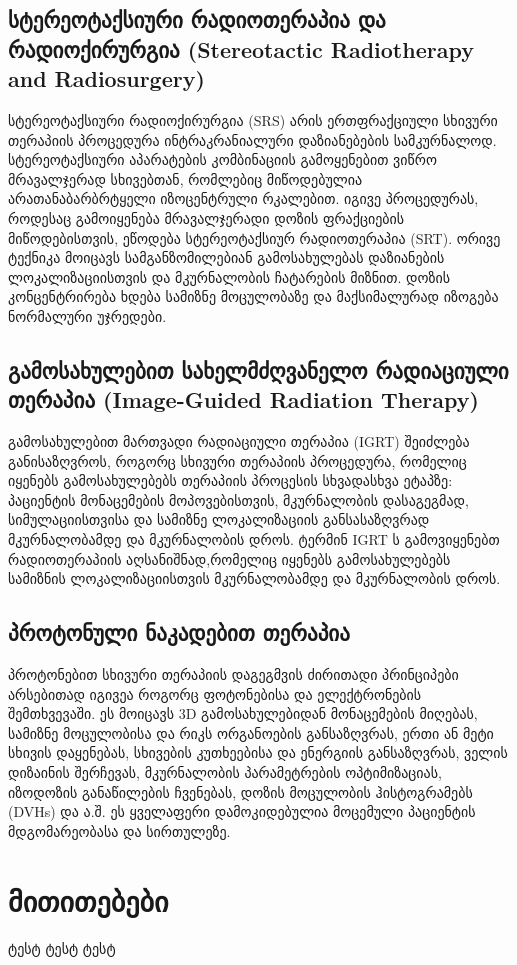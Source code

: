 \documentclass[12pt,a4paper,]{report}
\begin{document}
\section{სტერეოტაქსიური რადიოთერაპია და რადიოქირურგია (Stereotactic Radiotherapy and Radiosurgery)}
სტერეოტაქსიური რადიოქირურგია (SRS) არის ერთფრაქციული სხივური თერაპიის პროცედურა ინტრაკრანიალური დაზიანებების სამკურნალოდ. სტერეოტაქსიური აპარატების კომბინაციის გამოყენებით  ვიწრო მრავალჯერად სხივებთან, რომლებიც მიწოდებულია არათანაბარბრტყელი იზოცენტრული რკალებით. იგივე პროცედურას, როდესაც გამოიყენება მრავალჯერადი დოზის ფრაქციების მიწოდებისთვის, ეწოდება სტერეოტაქსიურ რადიოთერაპია (SRT). ორივე ტექნიკა მოიცავს სამგანზომილებიან გამოსახულებას დაზიანების ლოკალიზაციისთვის და მკურნალობის ჩატარების მიზნით. დოზის კონცენტრირება ხდება სამიზნე მოცულობაზე და მაქსიმალურად იზოგება ნორმალური უჯრედები.

\section{გამოსახულებით სახელმძღვანელო რადიაციული თერაპია (Image-Guided Radiation Therapy)}
გამოსახულებით მართვადი რადიაციული თერაპია (IGRT)  შეიძლება განისაზღვროს, როგორც სხივური თერაპიის პროცედურა, რომელიც იყენებს გამოსახულებებს თერაპიის პროცესის სხვადასხვა ეტაპზე: პაციენტის მონაცემების მოპოვებისთვის, მკურნალობის დასაგეგმად, სიმულაციისთვისა და სამიზნე ლოკალიზაციის განსასაზღვრად მკურნალობამდე და მკურნალობის დროს. ტერმინ IGRT ს გამოვიყენებთ რადიოთერაპიის აღსანიშნად,რომელიც იყენებს გამოსახულებებს სამიზნის ლოკალიზაციისთვის მკურნალობამდე და მკურნალობის დროს.

\section{პროტონული ნაკადებით თერაპია}
პროტონებით სხივური თერაპიის დაგეგმვის ძირითადი პრინციპები არსებითად იგივეა როგორც ფოტონებისა და ელექტრონების შემთხვევაში. ეს მოიცავს 3D გამოსახულებიდან მონაცემების მიღებას, სამიზნე მოცულობისა და რიკს ორგანოების განსაზღვრას, ერთი ან მეტი სხივის დაყენებას, სხივების კუთხეებისა და ენერგიის განსაზღვრას, ველის დიზაინის შერჩევას, მკურნალობის პარამეტრების ოპტიმიზაციას, იზოდოზის განაწილების ჩვენებას, დოზის მოცულობის ჰისტოგრამებს (DVHs)  და ა.შ. ეს ყველაფერი დამოკიდებულია მოცემული პაციენტის მდგომარეობასა და სირთულეზე.
\medskip


\chapter{მითითებები}
ტესტ ტესტ ტესტ
 
\end{document}
